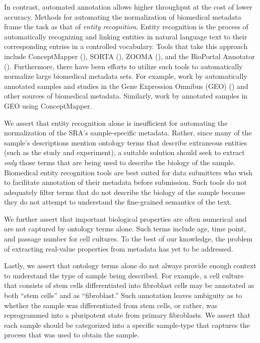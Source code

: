 In contrast, automated annotation allows higher throughput at the cost of lower accuracy. Methods for automating the normalization of biomedical metadata frame the task as that of \textit{entity recognition}. Entity recognition is the process of automatically recognizing and linking entities in natural language text to their corresponding entries in a controlled vocabulary.  Tools that take this approach include ConceptMapper (\citealp{Tanenblatt}), SORTA (\citealp{Pang}), ZOOMA (\citealp{Misha}), and the BioPortal Annotator (\citealp{Noy}).  Furthermore, there have been efforts to utilize such tools to automatically normalize large biomedical metadata sets.  For example, work by \cite{Shah} automatically annotated samples and studies in the Gene Expression Omnibus (GEO) (\citealp{Barrett2013}) and other sources of biomedical metadata. Similarly, work by \cite{Galeota} annotated samples in GEO using ConceptMapper. 

We assert that entity recognition alone is insufficient for automating the normalization of the SRA's sample-specific metadata.  Rather, since many of the sample's descriptions mention ontology terms that describe extraneous entities (such as the study and experiment), a suitable solution should seek to extract \textit{only} those terms that are being used to describe the biology of the sample. Biomedical entity recognition tools are best suited for data submitters who wish to facilitate annotation of their metadata before submission. Such tools do not adequately filter terms that do not describe the biology of the sample because they do not attempt to understand the fine-grained semantics of the text.

We further assert that important biological properties are often numerical and are not captured by ontology terms alone.  Such terms include age, time point, and passage number for cell cultures. To the best of our knowledge, the problem of extracting real-value properties from metadata has yet to be addressed.

Lastly, we assert that ontology terms alone do not always provide enough context to understand the type of sample being described.  For example, a cell culture that consists of stem cells differentiated into fibroblast cells may be annotated as both ``stem cells'' and as ``fibroblast.''  Such annotation leaves ambiguity as to whether the sample was differentiated from stem cells, or rather, was reprogrammed into a pluripotent state from primary fibroblasts.  We assert that each sample should be categorized into a specific sample-type that captures the process that was used to obtain the sample.  

